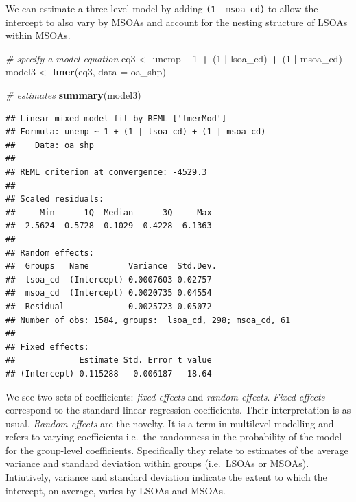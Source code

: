 \documentclass[
]{book}
\newenvironment{Shaded}{\begin{snugshade}}{\end{snugshade}}
\newcommand{\CommentTok}[1]{\textcolor[rgb]{0.56,0.35,0.01}{\textit{#1}}}
\newcommand{\DataTypeTok}[1]{\textcolor[rgb]{0.13,0.29,0.53}{#1}}
\newcommand{\DecValTok}[1]{\textcolor[rgb]{0.00,0.00,0.81}{#1}}
\newcommand{\KeywordTok}[1]{\textcolor[rgb]{0.13,0.29,0.53}{\textbf{#1}}}
\newcommand{\NormalTok}[1]{#1}
\newcommand{\OperatorTok}[1]{\textcolor[rgb]{0.81,0.36,0.00}{\textbf{#1}}}
\newcommand{\StringTok}[1]{\textcolor[rgb]{0.31,0.60,0.02}{#1}}
\begin{document}
We can estimate a three-level model by adding \texttt{(1\ \textbar{}\ msoa\_cd)} to allow the intercept to also vary by MSOAs and account for the nesting structure of LSOAs within MSOAs.

\begin{Shaded}
\begin{Highlighting}[]
\CommentTok{# specify a model equation}
\NormalTok{eq3 <-}\StringTok{ }\NormalTok{unemp }\OperatorTok{~}\StringTok{ }\DecValTok{1} \OperatorTok{+}\StringTok{ }\NormalTok{(}\DecValTok{1} \OperatorTok{|}\StringTok{ }\NormalTok{lsoa_cd) }\OperatorTok{+}\StringTok{ }\NormalTok{(}\DecValTok{1} \OperatorTok{|}\StringTok{ }\NormalTok{msoa_cd)}
\NormalTok{model3 <-}\StringTok{ }\KeywordTok{lmer}\NormalTok{(eq3, }\DataTypeTok{data =}\NormalTok{ oa_shp)}

\CommentTok{# estimates}
\KeywordTok{summary}\NormalTok{(model3)}
\end{Highlighting}
\end{Shaded}

\begin{verbatim}
## Linear mixed model fit by REML ['lmerMod']
## Formula: unemp ~ 1 + (1 | lsoa_cd) + (1 | msoa_cd)
##    Data: oa_shp
## 
## REML criterion at convergence: -4529.3
## 
## Scaled residuals: 
##     Min      1Q  Median      3Q     Max 
## -2.5624 -0.5728 -0.1029  0.4228  6.1363 
## 
## Random effects:
##  Groups   Name        Variance  Std.Dev.
##  lsoa_cd  (Intercept) 0.0007603 0.02757 
##  msoa_cd  (Intercept) 0.0020735 0.04554 
##  Residual             0.0025723 0.05072 
## Number of obs: 1584, groups:  lsoa_cd, 298; msoa_cd, 61
## 
## Fixed effects:
##             Estimate Std. Error t value
## (Intercept) 0.115288   0.006187   18.64
\end{verbatim}

We see two sets of coefficients: \emph{fixed effects} and \emph{random effects}. \emph{Fixed effects} correspond to the standard linear regression coefficients. Their interpretation is as usual. \emph{Random effects} are the novelty. It is a term in multilevel modelling and refers to varying coefficients i.e.~the randomness in the probability of the model for the group-level coefficients. Specifically they relate to estimates of the average variance and standard deviation within groups (i.e.~LSOAs or MSOAs). Intiutively, variance and standard deviation indicate the extent to which the intercept, on average, varies by LSOAs and MSOAs.
\end{document}
